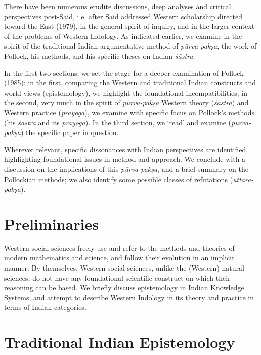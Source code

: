 There have been numerous erudite discussions, deep analyses and critical perspectives post-Said, i.e. after Said  addressed Western scholarship directed toward the East (1979), in the general spirit of inquiry, and in the larger context of the problems of Western Indology. As indicated earlier, we examine in the spirit of the traditional Indian argumentative method of {\sl pūrva-pakṣa}, the work of Pollock, his methods, and his specific theses on Indian {\sl śāstra}.  

In the first two sections, we set the stage for a deeper examination of Pollock (1985): in the first, comparing the Western and traditional Indian constructs and world-views (epistemology), we highlight the foundational incompatibilities; in the second, very much in the spirit of {\sl pūrva-pakṣa} Western theory ({\sl śāstra}) and Western practice ({\sl prayoga}), we examine with specific focus on Pollock's methods (his {\sl śāstra} and its {\sl prayoga}). In the third section, we `read' and examine ({\sl pūrva-pakṣa}) the specific paper in question. 

Wherever relevant, specific dissonances with Indian perspectives are identified, highlighting foundational issues in method and approach. We conclude with a discussion on the implications of this {\sl pūrva-pakṣa}, and a brief summary on the Pollockian methods; we also identify some possible classes of refutations ({\sl uttara-pakṣa}).\\[-20pt]

\section*{Preliminaries}

Western social sciences freely use and refer to the methods and theories of modern mathematics and science, and follow their evolution in an implicit manner.  By themselves, Western social sciences, unlike the (Western) natural sciences, do not have any foundational scientific construct on which their reasoning can be based. We briefly discuss epistemology in Indian Knowledge Systems, and attempt to describe Western Indology in its theory and practice in terms of Indian categories.\\[-20pt]

\section*{Traditional Indian Epistemology}

